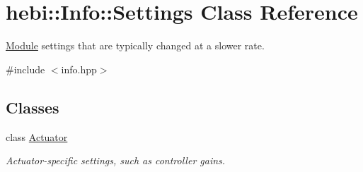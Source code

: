 \hypertarget{classhebi_1_1Info_1_1Settings}{}\section{hebi\+:\+:Info\+:\+:Settings Class Reference}
\label{classhebi_1_1Info_1_1Settings}


\hyperlink{classhebi_1_1Module}{Module} settings that are typically changed at a slower rate.  




{\ttfamily \#include $<$info.\+hpp$>$}

\subsection*{Classes}
\begin{DoxyCompactItemize}
\item 
class \hyperlink{classhebi_1_1Info_1_1Settings_1_1Actuator}{Actuator}
\begin{DoxyCompactList}\small\item\em Actuator-\/specific settings, such as controller gains. \end{DoxyCompactList}\end{DoxyCompactItemize}

